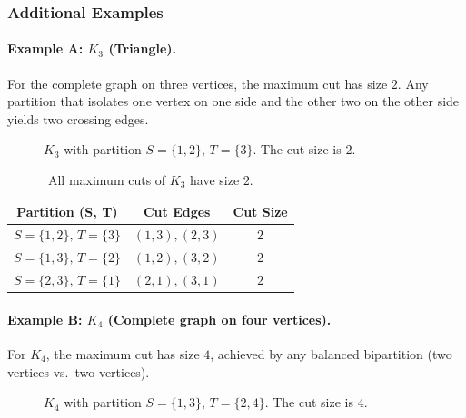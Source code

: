 \documentclass[12pt]{article}
\begin{document}
\subsubsection*{Additional Examples}

\paragraph{Example A: $K_3$ (Triangle).}
For the complete graph on three vertices, the maximum cut has size $2$. Any partition that isolates one vertex on one side and the other two on the other side yields two crossing edges.

\begin{figure}[h!]
    \centering
    \caption{$K_3$ with partition $S=\{1,2\}$, $T=\{3\}$. The cut size is $2$.}
\end{figure}

\begin{table}[h!]
\centering
\begin{tabular}{|c|c|c|}
\hline
\textbf{Partition (S, T)} & \textbf{Cut Edges} & \textbf{Cut Size} \\
\hline
\rowcolor{yellow!20} $S=\{1,2\},\,T=\{3\}$ & $(1,3), (2,3)$ & $2$ \\
$S=\{1,3\},\,T=\{2\}$ & $(1,2), (3,2)$ & $2$ \\
$S=\{2,3\},\,T=\{1\}$ & $(2,1), (3,1)$ & $2$ \\
\hline
\end{tabular}
\caption{All maximum cuts of $K_3$ have size $2$.}
\end{table}

\paragraph{Example B: $K_4$ (Complete graph on four vertices).}
For $K_4$, the maximum cut has size $4$, achieved by any balanced bipartition (two vertices vs.\ two vertices).

\begin{figure}[h!]
    \centering
    \caption{$K_4$ with partition $S=\{1,3\}$, $T=\{2,4\}$. The cut size is $4$.}
\end{figure}
\end{document}

